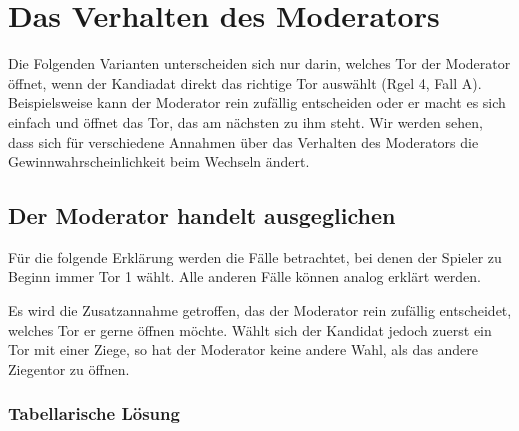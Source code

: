 \section{Das Verhalten des Moderators}

Die Folgenden Varianten unterscheiden sich nur darin, welches Tor der Moderator öffnet, wenn der Kandiadat direkt das richtige Tor auswählt (Rgel 4, Fall A). Beispielsweise kann der Moderator rein zufällig entscheiden oder er macht es sich einfach und öffnet das Tor, das am nächsten zu ihm steht. Wir werden sehen, dass sich für verschiedene Annahmen über das Verhalten des Moderators die Gewinnwahrscheinlichkeit beim Wechseln ändert.


\subsection{Der Moderator handelt ausgeglichen}

Für die folgende Erklärung werden die Fälle betrachtet, bei denen der Spieler zu Beginn immer Tor 1 wählt. Alle anderen Fälle können analog erklärt werden.

Es wird die Zusatzannahme getroffen, das der Moderator rein zufällig entscheidet, welches Tor er gerne öffnen möchte. Wählt sich der Kandidat jedoch zuerst ein Tor mit einer Ziege, so hat der Moderator keine andere Wahl, als das andere Ziegentor zu öffnen.

\subsubsection{Tabellarische Lösung}


